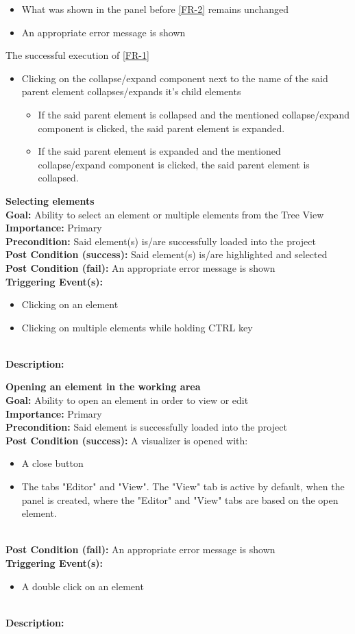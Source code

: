 \documentclass[10pt,a4paper]{report}
\newcommand{\precondition}[1]{
    \textbf{Precondition: } #1 \leavevmode \\
}
\newcommand{\FRDescription}[8]{
    \textbf{#1} \leavevmode \\
    \textbf{Goal: } #2 \leavevmode \\
    \textbf{Importance: } #3 \leavevmode \\
    \precondition{#4}
    \textbf{Post Condition (success): } #5 \leavevmode \\
    \textbf{Post Condition (fail): } #6 \leavevmode \\
    \textbf{Triggering Event(s): } #7 \leavevmode \\
    \textbf{Description: } \leavevmode \\ 
    #8}
\begin{document}
\begin{FR}
{\begin{itemize}
        \item What was shown in the panel before \ref{FR-2} remains unchanged
        \item An appropriate error message is shown
    \end{itemize}}
    {The successful execution of \ref{FR-1}}
    {\begin{itemize}
        \item Clicking on the collapse/expand component next to the name of the said parent element collapses/expands it's child elements
        \begin{itemize}
            \item If the said parent element is collapsed and the mentioned collapse/expand component is clicked, the said parent element is expanded.
            \item If the said parent element is expanded and the mentioned collapse/expand component is clicked, the said parent element is collapsed.
        \end{itemize}
    \end{itemize}}
    \item \FRDescription{Selecting elements\label{FR-3}}
    {Ability to select an element or multiple elements from the Tree View}
    {Primary}
    {Said element(s) is/are successfully loaded into the project}
    {Said element(s) is/are highlighted and selected}
    {An appropriate error message is shown}
    {\begin{itemize}
                \item Clicking on an element
                \item Clicking on multiple elements while holding CTRL key
            \end{itemize} }
    \item \FRDescription{Opening an element in the working area\label{FR-4}}
    {Ability to open an element in order to view or edit}
    {Primary}
    {Said element is successfully loaded into the project}
    {A visualizer is opened with:
    \begin{itemize}
        \item A close button 
        \item The tabs "Editor" and "View". The "View" tab is active by default, when the panel is created, where the "Editor" and "View" tabs are based on the open element.
    \end{itemize}}
    {An appropriate error message is shown}
    {\begin{itemize}
        \item A double click on an element

\end{itemize}}
\end{FR}
\end{document}
